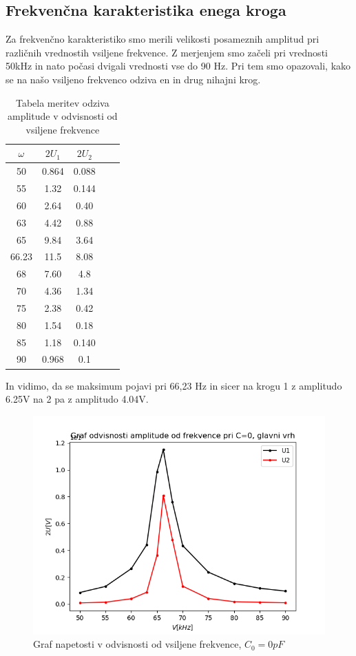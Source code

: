 \documentclass[11pt, a4paper]{article}
\theoremstyle{definition}
\theoremstyle{example}
\theoremstyle{izrek}
\begin{document}
\subsection{Frekvenčna karakteristika enega kroga}
Za frekvenčno karakteristiko smo merili velikosti posameznih amplitud pri različnih vrednostih vsiljene frekvence. Z merjenjem smo začeli pri vrednosti 50kHz in nato počasi dvigali vrednosti vse do 90 Hz. Pri tem smo opazovali, kako se na našo vsiljeno frekvenco odziva en in drug nihajni krog. \\
\begin{table}[ht]
	\centering
	\begin{tabular}{|c|c|c|c|c|}
		\hline
		$\omega$ & $2U_1$ & $2U_2$ \\
		\hline
		\hline
		50 & 0.864 & 0.088 \\
		\hline
		55 & 1.32 & 0.144 \\
		\hline
		60 & 2.64 & 0.40 \\
		\hline
		63 & 4.42 & 0.88 \\
		\hline
		65 & 9.84 & 3.64 \\
		\hline
		\hline
		66.23 & 11.5 & 8.08 \\
		\hline
		\hline
		68 & 7.60 & 4.8 \\
		\hline
		70 & 4.36 & 1.34 \\
		\hline
		75 & 2.38 & 0.42 \\
		\hline
		80 & 1.54 & 0.18 \\
		\hline
		85 & 1.18 & 0.140 \\
		\hline
		90 & 0.968 & 0.1 \\
		\hline
		\end{tabular}
		\caption{Tabela meritev odziva amplitude v odvisnosti od vsiljene frekvence }
		\label{tab:FirstTable}
\end{table}

In vidimo, da se maksimum pojavi pri 66,23 Hz in sicer na krogu 1 z amplitudo 6.25V na 2 pa z amplitudo 4.04V.\\
\begin{figure}[htp]
    \centering
    \includegraphics[width=12cm]{Karakteristika za C=0.png}
    \caption{Graf napetosti v odvisnosti od vsiljene frekvence, $C_0=0 pF$}
\end{figure}
\end{document}

